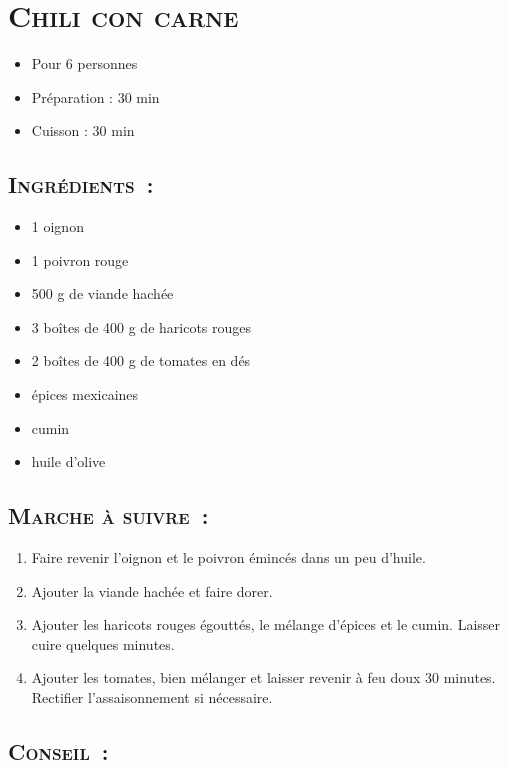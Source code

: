 \section[\normalsize{Chili con carne}]{\LARGE{\textsc{Chili con carne}}}		%


\begin{itemize}
\item Pour 6 personnes
\item Préparation : 30 min
\item Cuisson : 30 min
\end{itemize}

\subsection*{\textsc{Ingr\'edients~:}}

\begin{itemize}
\item 1 oignon
\item 1 poivron rouge
\item 500 g de viande hach\'ee
\item 3 bo\^ites de 400 g de haricots rouges
\item 2 bo\^ites de 400 g de tomates en d\'es
\item \'epices mexicaines
\item cumin
\item huile d'olive
\end{itemize}


\subsection*{\textsc{Marche \`a suivre~:}}

\begin{enumerate}
\item Faire revenir l'oignon et le poivron \'eminc\'es dans un peu d'huile. 
\item Ajouter la viande hach\'ee et faire dorer.
\item Ajouter les haricots rouges \'egoutt\'es, le m\'elange d'\'epices et le cumin. Laisser cuire quelques minutes.
\item Ajouter les tomates, bien m\'elanger et laisser revenir \`a feu doux 30 minutes. Rectifier l'assaisonnement si n\'ecessaire.
\end{enumerate}
\subsection*{\textsc{Conseil~:}}

